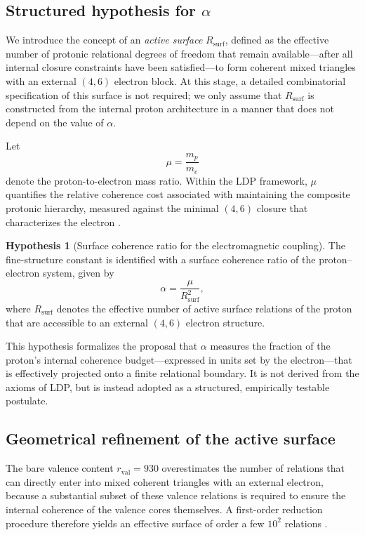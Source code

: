 \documentclass[11pt,a4paper]{article}
\theoremstyle{plain}
\theoremstyle{definition}
\newtheorem{hypothesis}{Hypothesis}
\theoremstyle{remark}
\begin{document}
\subsection{Structured hypothesis for \texorpdfstring{\(\alpha\)}{alpha}}

We introduce the concept of an \emph{active surface} \(R_{\mathrm{surf}}\), defined as the effective number of protonic relational degrees of freedom that remain available—after all internal closure constraints have been satisfied—to form coherent mixed triangles with an external \((4,6)\) electron block. At this stage, a detailed combinatorial specification of this surface is not required; we only assume that \(R_{\mathrm{surf}}\) is constructed from the internal proton architecture in a manner that does not depend on the value of \(\alpha\).

Let
\[
  \mu = \frac{m_p}{m_e}
\]
denote the proton-to-electron mass ratio. Within the LDP framework, \(\mu\) quantifies the relative coherence cost associated with maintaining the composite protonic hierarchy, measured against the minimal \((4,6)\) closure that characterizes the electron \cite{Laubscher2026PDL_English,Laubscher2026IntroPDL}.

\begin{hypothesis}[Surface coherence ratio for the electromagnetic coupling]
\label{hyp:alpha_surface_ratio}
The fine-structure constant is identified with a surface coherence ratio of the proton–electron system, given by
\[
\alpha = \frac{\mu}{R_{\mathrm{surf}}^2},
\]
where \(R_{\mathrm{surf}}\) denotes the effective number of active surface relations of the proton that are accessible to an external \((4,6)\) electron structure.
\end{hypothesis}

This hypothesis formalizes the proposal that \(\alpha\) measures the fraction of the proton’s internal coherence budget—expressed in units set by the electron—that is effectively projected onto a finite relational boundary. It is not derived from the axioms of LDP, but is instead adopted as a structured, empirically testable postulate.

\subsection{Geometrical refinement of the active surface}

The bare valence content \(r_{\mathrm{val}} = 930\) overestimates the number of relations that can directly enter into mixed coherent triangles with an external electron, because a substantial subset of these valence relations is required to ensure the internal coherence of the valence cores themselves. A first-order reduction procedure therefore yields an effective surface of order a few \(10^2\) relations \cite{Laubscher2026PDL_English,Laubscher2026LDP_French}.
\end{document}
